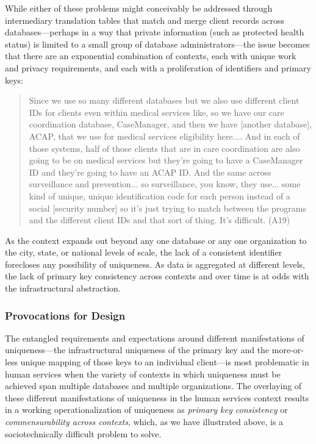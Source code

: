 While either of these problems might conceivably be addressed through intermediary translation tables that match and merge client records across databases---perhaps in a way that private information (such as protected health status) is limited to a small group of database administrators---the issue becomes that there are an exponential combination of contexts, each with unique work and privacy requirements, and each with a proliferation of identifiers and primary keys:

\begin{quote}\singlespacing Since we use so many different databases but we also use different client IDs for clients even within medical services like, so we have our care coordination database, CaseManager, and then we have [another database], ACAP, that we use for medical services eligibility here.... And in each of those systems, half of those clients that are in care coordination are also going to be on medical services but they're going to have a CaseManager ID and they're going to have an ACAP ID. And the same across surveillance and prevention... so surveillance, you know, they use... some kind of unique, unique identification code for each person instead of a social [security number] so it's just trying to match between the programs and the different client IDs and that sort of thing. It's difficult. (A19)\end{quote}

As the context expands out beyond any one database or any one organization to the city, state, or national levels of scale, the lack of a consistent identifier forecloses any possibility of uniqueness. As data is aggregated at different levels, the lack of primary key consistency across contexts and over time is at odds with the infrastructural abstraction.

\subsubsection{Provocations for Design}
The entangled requirements and expectations around different manifestations of uniqueness---the infrastructural uniqueness of the primary key and the more-or-less unique mapping of those keys to an individual client---is most problematic in human services when the variety of contexts in which uniqueness must be achieved span multiple databases and multiple organizations. The overlaying of these different manifestations of uniqueness in the human services context results in a working operationalization of uniqueness as \textit{primary key consistency} or \textit{commensurability across contexts}, which, as we have illustrated above, is a sociotechnically difficult problem to solve.

